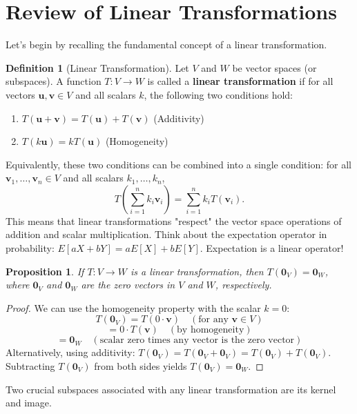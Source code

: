 \documentclass[11pt]{article}
\newtheorem{proposition}[theorem]{Proposition}
\theoremstyle{definition}
\newtheorem{definition}[theorem]{Definition}
\theoremstyle{remark}
\begin{document}

\section{Review of Linear Transformations}

Let's begin by recalling the fundamental concept of a linear transformation.

\begin{definition}[Linear Transformation]
Let $V$ and $W$ be vector spaces (or subspaces). A function $T: V \to W$ is called a \textbf{linear transformation} if for all vectors $\mathbf{u}, \mathbf{v} \in V$ and all scalars $k$, the following two conditions hold:
\begin{enumerate}
    \item $T(\mathbf{u} + \mathbf{v}) = T(\mathbf{u}) + T(\mathbf{v})$ (Additivity)
    \item $T(k\mathbf{u}) = k T(\mathbf{u})$ (Homogeneity)
\end{enumerate}
Equivalently, these two conditions can be combined into a single condition: for all $\mathbf{v}_1, \dots, \mathbf{v}_n \in V$ and all scalars $k_1, \dots, k_n$,
\[
T\left( \sum_{i=1}^n k_i \mathbf{v}_i \right) = \sum_{i=1}^n k_i T(\mathbf{v}_i).
\]
This means that linear transformations "respect" the vector space operations of addition and scalar multiplication. Think about the expectation operator in probability: $E[aX+bY] = aE[X] + bE[Y]$. Expectation is a linear operator!
\end{definition}

\begin{proposition}
If $T: V \to W$ is a linear transformation, then $T(\mathbf{0}_V) = \mathbf{0}_W$, where $\mathbf{0}_V$ and $\mathbf{0}_W$ are the zero vectors in $V$ and $W$, respectively.
\end{proposition}
\begin{proof}
We can use the homogeneity property with the scalar $k=0$:
\[ T(\mathbf{0}_V) = T(0 \cdot \mathbf{v}) \quad (\text{for any } \mathbf{v} \in V) \]
\[ = 0 \cdot T(\mathbf{v}) \quad (\text{by homogeneity}) \]
\[ = \mathbf{0}_W \quad (\text{scalar zero times any vector is the zero vector}) \]
Alternatively, using additivity: $T(\mathbf{0}_V) = T(\mathbf{0}_V + \mathbf{0}_V) = T(\mathbf{0}_V) + T(\mathbf{0}_V)$. Subtracting $T(\mathbf{0}_V)$ from both sides yields $T(\mathbf{0}_V) = \mathbf{0}_W$.
\end{proof}

Two crucial subspaces associated with any linear transformation are its kernel and image.
\end{document}
